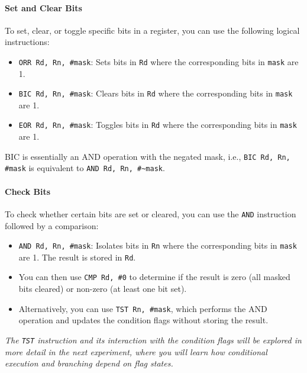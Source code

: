 \paragraph{Set and Clear Bits}
To set, clear, or toggle specific bits in a register, you can use the following logical instructions:
\begin{itemize}[nosep]
    \item \texttt{ORR Rd, Rn, \#mask}: Sets bits in \texttt{Rd} where the corresponding bits in \texttt{mask} are 1.
    \item \texttt{BIC Rd, Rn, \#mask}: Clears bits in \texttt{Rd} where the corresponding bits in \texttt{mask} are 1.
    \item \texttt{EOR Rd, Rn, \#mask}: Toggles bits in \texttt{Rd} where the corresponding bits in \texttt{mask} are 1.
\end{itemize}

BIC is essentially an AND operation with the negated mask, i.e., \texttt{BIC Rd, Rn, \#mask} is equivalent to \texttt{AND Rd, Rn, \#\textasciitilde{}mask}.\\

\paragraph{Check Bits}
To check whether certain bits are set or cleared, you can use the \texttt{AND} instruction followed by a comparison:
\begin{itemize}[nosep]
    \item \texttt{AND Rd, Rn, \#mask}: Isolates bits in \texttt{Rn} where the corresponding bits in \texttt{mask} are 1. The result is stored in \texttt{Rd}.
    \item You can then use \texttt{CMP Rd, \#0} to determine if the result is zero (all masked bits cleared) or non-zero (at least one bit set).
    \item Alternatively, you can use \texttt{TST Rn, \#mask}, which performs the AND operation and updates the condition flags without storing the result.
\end{itemize}

\noindent\textit{The \texttt{TST} instruction and its interaction with the condition flags will be explored in more detail in the next experiment, where you will learn how conditional execution and branching depend on flag states.}

